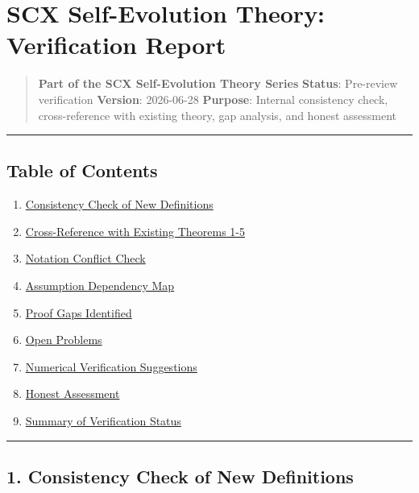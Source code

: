 \documentclass[
  12pt,
]{ctexart}
\author{SCX}
\date{2026}
\providecommand{\tightlist}{%
  \setlength{\itemsep}{0pt}\setlength{\parskip}{0pt}}
\begin{document}
\section{SCX Self-Evolution Theory: Verification
Report}\label{scx-self-evolution-theory-verification-report}

\begin{quote}
\textbf{Part of the SCX Self-Evolution Theory Series} \textbf{Status}:
Pre-review verification \textbf{Version}: 2026-06-28 \textbf{Purpose}:
Internal consistency check, cross-reference with existing theory, gap
analysis, and honest assessment
\end{quote}

\begin{center}\rule{0.5\linewidth}{0.5pt}\end{center}

\subsection{Table of Contents}\label{table-of-contents}

\begin{enumerate}
\def\labelenumi{\arabic{enumi}.}
\tightlist
\item
  \hyperref[1-consistency-check-of-new-definitions]{Consistency Check of
  New Definitions}
\item
  \hyperref[2-cross-reference-with-existing-theorems-1-5]{Cross-Reference
  with Existing Theorems 1-5}
\item
  \hyperref[3-notation-conflict-check]{Notation Conflict Check}
\item
  \hyperref[4-assumption-dependency-map]{Assumption Dependency Map}
\item
  \hyperref[5-proof-gaps-identified]{Proof Gaps Identified}
\item
  \hyperref[6-open-problems]{Open Problems}
\item
  \hyperref[7-numerical-verification-suggestions]{Numerical Verification
  Suggestions}
\item
  \hyperref[8-honest-assessment]{Honest Assessment}
\item
  \hyperref[9-summary-of-verification-status]{Summary of Verification
  Status}
\end{enumerate}

\begin{center}\rule{0.5\linewidth}{0.5pt}\end{center}

\subsection{1. Consistency Check of New
Definitions}\label{consistency-check-of-new-definitions}
\end{document}
